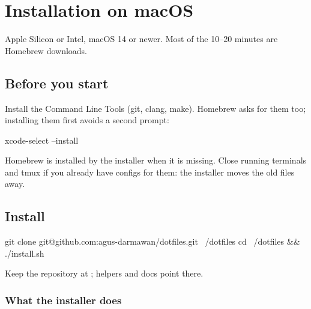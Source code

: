 \chapter{Installation on macOS}\label{ch:install}

Apple Silicon or Intel, macOS 14 or newer. Most of the 10--20 minutes are Homebrew downloads.

\section{Before you start}

Install the Command Line Tools (git, clang, make). Homebrew asks for them too; installing them first
avoids a second prompt:

\begin{shell}
xcode-select --install
\end{shell}

Homebrew is installed by the installer when it is missing. Close running terminals and tmux if you
already have configs for them: the installer moves the old files away.

\section{Install}

\begin{shell}
git clone git@github.com:agus-darmawan/dotfiles.git ~/dotfiles
cd ~/dotfiles && ./install.sh
\end{shell}

Keep the repository at ; helpers and docs point there.

\subsection{What the installer does}

